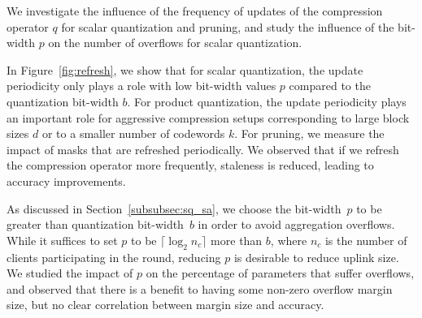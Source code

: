 We investigate the influence of the frequency of updates of the compression operator $q$ for scalar quantization and pruning, and study the influence of the \SecAgg bit-width $p$ on the number of overflows for scalar quantization.

 In Figure~\ref{fig:refresh}, we show that for scalar quantization, the update periodicity only plays a role with low \SecAgg bit-width values $p$ compared to the quantization bit-width $b$. For product quantization, the update periodicity plays an important role for aggressive compression setups corresponding to large block sizes $d$ or to a smaller number of codewords $k$. For pruning, we measure the impact of masks that are refreshed periodically.
We observed that if we refresh the compression operator more frequently, staleness is reduced, leading to accuracy improvements.

As discussed in Section~\ref{subsubsec:sq_sa}, we choose the \SecAgg bit-width~$p$ to be greater than quantization bit-width~$b$ in order to avoid aggregation overflows. While it suffices to set $p$ to be $\lceil\log_2 n_c\rceil$ more than $b$, where $n_c$ is the number of clients participating in the round, reducing $p$ is desirable to reduce uplink size.
We studied the impact of  $p$ on the percentage of parameters that suffer overflows, and
observed that there is a benefit to having some non-zero overflow margin size, but no clear correlation between margin size and accuracy.



